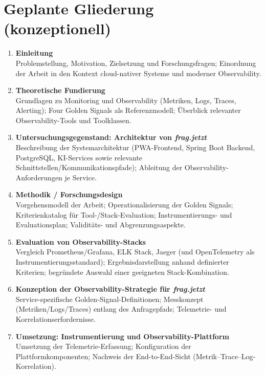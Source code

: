 \section{Geplante Gliederung (konzeptionell)}

\begin{enumerate}
  \item \textbf{Einleitung} \\
  Problemstellung, Motivation, Zielsetzung und Forschungsfragen; Einordnung der Arbeit in den Kontext cloud-nativer Systeme und moderner Observability.

  \item \textbf{Theoretische Fundierung} \\
  Grundlagen zu Monitoring und Observability (Metriken, Logs, Traces, Alerting); Four Golden Signals als Referenzmodell; Überblick relevanter Observability-Tools und Toolklassen.

  \item \textbf{Untersuchungsgegenstand: Architektur von \emph{frag.jetzt}} \\
  Beschreibung der Systemarchitektur (PWA-Frontend, Spring Boot Backend, PostgreSQL, KI-Services sowie relevante Schnittstellen/Kommunikationspfade); Ableitung der Observability-Anforderungen je Service.

  \item \textbf{Methodik / Forschungsdesign} \\
  Vorgehensmodell der Arbeit; Operationalisierung der Golden Signals; Kriterienkatalog für Tool-/Stack-Evaluation; Instrumentierungs- und Evaluationsplan; Validitäts- und Abgrenzungsaspekte.

  \item \textbf{Evaluation von Observability-Stacks} \\
  Vergleich Prometheus/Grafana, ELK Stack, Jaeger (und OpenTelemetry als Instrumentierungsstandard); Ergebnisdarstellung anhand definierter Kriterien; begründete Auswahl einer geeigneten Stack-Kombination.

  \item \textbf{Konzeption der Observability-Strategie für \emph{frag.jetzt}} \\
  Service-spezifische Golden-Signal-Definitionen; Messkonzept (Metriken/Logs/Traces) entlang des Anfragepfads; Telemetrie- und Korrelationserfordernisse.

  \item \textbf{Umsetzung: Instrumentierung und Observability-Plattform} \\
  Umsetzung der Telemetrie-Erfassung; Konfiguration der Plattformkomponenten; Nachweis der End-to-End-Sicht (Metrik–Trace–Log-Korrelation).


\end{enumerate}
